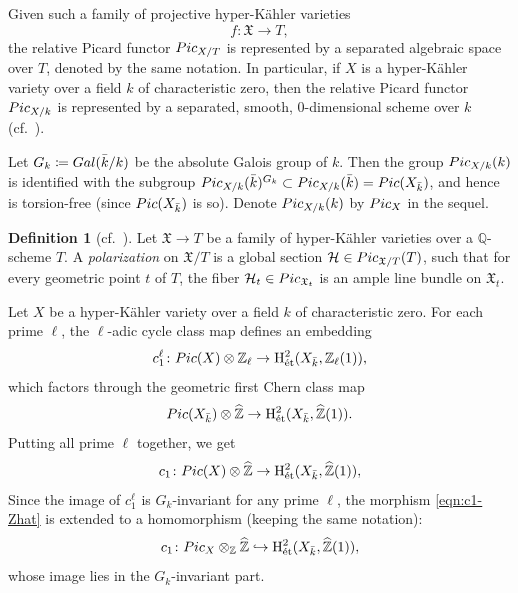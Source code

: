\documentclass[11pt,reqno,oneside]{amsart}
\numberwithin{equation}{section}
\theoremstyle{definition}
\newtheorem{definition}[theorem]{Definition}
\newcommand{\Pic}{{\rm Pic}}
\newcommand{\Gal}{{\rm Gal}}
\DeclareMathOperator{\et}{\Acute{e}t}
\newcommand\rH{\mathrm{H}}
\newcommand{\QQ}{\mathbb{Q}}
\newcommand{\ZZ}{\mathbb{Z}}
\newcommand{\fX}{\mathfrak{X}}
\begin{document}
Given such a family of projective hyper-Kähler varieties $$f\colon \fX \to T,$$
the relative Picard functor $\Pic_{X/T}$ is represented by a separated algebraic space over $T$, denoted by the same notation. In particular, if $X$ is a hyper-Kähler variety over a field $k$ of characteristic zero,  then the relative Picard functor $\Pic_{X/k}$ is represented by a separated, smooth, $0$-dimensional scheme over $k$ (cf.~\cite[\S 8.4, Theorem 1]{BLR90}). 

Let $G_k\coloneqq \Gal(\bar{k}/k)$ be the absolute Galois group of $k$.
Then the group $\Pic_{X/k}(k)$ is identified with the subgroup 
$\Pic_{X/k}(\bar{k})^{G_k} \subset \Pic_{X/k}(\bar{k})=\Pic(X_{\bar{k}})$, and hence is torsion-free (since $\Pic(X_{\bar{k}})$ is so). Denote $\Pic_{X/k}(k)$ by $\Pic_X$ in the sequel. 


\begin{definition}[cf.~\cite{A96,Ri06}] 
Let $\fX\to T$ be a family of hyper-Kähler varieties over a $\QQ$-scheme $T$.
A \textit{polarization} on $\fX/T$ is a global section $\mathcal{H} \in  \Pic_{ \fX/T}(T)$, such that for every geometric point $t$ of $T$, the fiber $\mathcal{H}_t\in \Pic_{\fX_t}$ is an ample line bundle on $\fX_t$. 
\end{definition}

Let $X$ be a hyper-Kähler variety over a field $k$ of characteristic zero. For each prime $\ell$, the $\ell$-adic cycle class map defines an embedding
\[
c_1^{\ell} \colon \Pic(X)\otimes \ZZ_\ell \rightarrow \rH^2_{\et}(X_{\bar{k}},\ZZ_\ell(1)),
\]
which factors through the geometric first Chern class map
\begin{equation}
\label{eqn:c1-kbar}
\Pic(X_{\bar{k}}) \otimes \widehat{\ZZ} \to \rH^2_{\et}(X_{\bar{k}}, \widehat{\ZZ}(1)).
\end{equation}
Putting all prime $\ell$ together, we get 
\begin{equation}\label{eqn:c1-Zhat}
c_1 \colon \Pic(X)\otimes \widehat{\ZZ} \rightarrow \rH^2_{\et}(X_{\bar{k}},\widehat{\ZZ}(1)),
\end{equation}
Since the image of $c_1^{\ell}$ is $G_k$-invariant for any prime $\ell$, the morphism \eqref{eqn:c1-Zhat} is extended to a homomorphism (keeping the same notation):
\begin{equation}\label{eqn:c1-extended}
c_1 \colon  \Pic_X \otimes_{\ZZ} \widehat{\ZZ} \hookrightarrow \rH^2_{\et}(X_{\bar{k}}, \widehat{\ZZ}(1)),
\end{equation}
whose image lies in the $G_{k}$-invariant part. 
\end{document}
